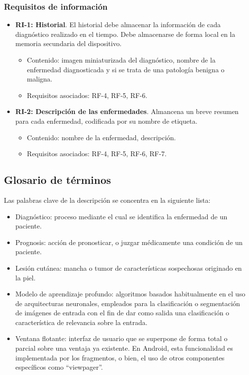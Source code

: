 \subsubsection{Requisitos de información}

\begin{itemize}
	 \item \textbf{RI-1: Historial}. El historial debe almacenar la información de cada diagnóstico realizado en el tiempo. Debe almacenarse de forma local en la memoria secundaria del dispositivo.
	 \begin{itemize}
	 	\item Contenido: imagen miniaturizada del diagnóstico, nombre de la enfermedad diagnosticada y si se trata de una patología benigna o maligna. 
	 	\item Requisitos asociados: RF-4, RF-5, RF-6.
	 \end{itemize}
	\item  \textbf{RI-2: Descripción de las enfermedades}. Almancena un breve resumen para cada enfermedad, codificada por su nombre de etiqueta.
		 \begin{itemize}
		\item Contenido: nombre de la enfermedad, descripción.
		\item Requisitos asociados: RF-4, RF-5, RF-6, RF-7.
	\end{itemize}
\end{itemize}

\subsection{Glosario de términos}
Las palabras clave de la descripción se concentra en la siguiente lista:
\begin{itemize}
	\item Diagnóstico: proceso mediante el cual se identifica la enfermedad de un paciente.
	\item Prognosis: acción de pronosticar, o juzgar médicamente una condición de un paciente.
	\item Lesión cutánea: mancha o tumor de características sospechosas originado en la piel.
	\item Modelo de aprendizaje profundo: algoritmos basados habitualmente en el uso de arquitecturas neuronales, empleados para la clasificación o segmentación de imágenes de entrada con el fin de dar como salida una clasificación o característica de relevancia sobre la entrada.
	\item Ventana flotante: interfaz de usuario que se superpone de forma total o parcial sobre una ventaja ya existente. En Android, esta funcionalidad es implementada por los fragmentos, o bien, el uso de otros componentes específicos como ``viewpager''.
\end{itemize}

